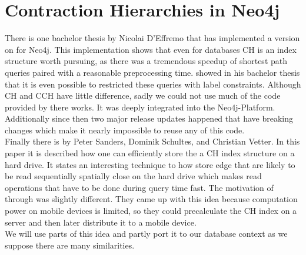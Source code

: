 \section{Contraction Hierarchies in Neo4j}\label{sec:related_work:database}

There is one bachelor thesis by Nicolai D'Effremo \cite[Some text]{DEffremo2019} that has implemented a version on \cite[Contraction Hierarchies]{Geisberger_2012} for Neo4j.
This implementation shows that even for databases CH is an index structure worth pursuing, as there was a tremendous speedup of shortest path queries paired with a reasonable preprocessing time.
\cite{Zickenberg2021} showed in his bachelor thesis that it is even possible to restricted these queries with label constraints.
Although CH and CCH have little difference, sadly we could not use much of the code provided by there works.
It was deeply integrated into the Neo4j-Platform.
Additionally since then two major release updates happened that have breaking changes which make it nearly impossible to reuse any of this code.
\\
Finally there is \cite[Mobile Route Planning]{Sanders} by Peter Sanders, Dominik Schultes, and Christian Vetter.
In this paper it is described how one can efficiently store the a CH index structure on a hard drive.
It states an interesting technique to how store edge that are likely to be read sequentially spatially close on the hard drive which makes read operations that have to be done during query time fast.
The motivation of \cite[Mobile Route Planning]{Sanders} through was slightly different.
They came up with this idea because computation power on mobile devices is limited, so they could precalculate the CH index on a server and then later distribute it to a mobile device.
\\
We will use parts of this idea and partly port it to our database context as we suppose there are many similarities.
